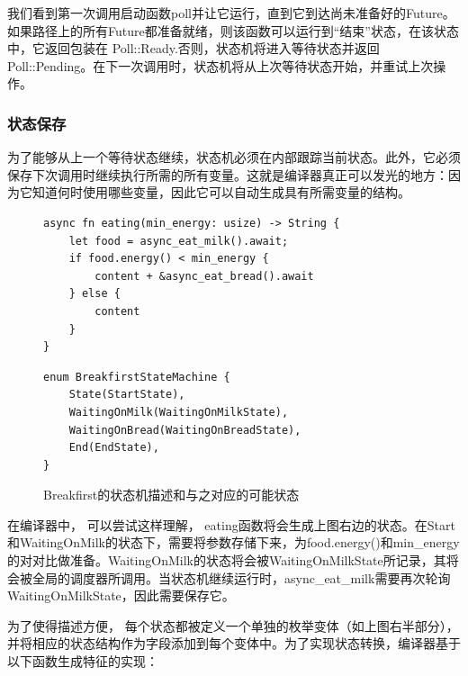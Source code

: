 我们看到第一次调用启动函数poll并让它运行，直到它到达尚未准备好的Future。如果路径上的所有Future都准备就绪，则该函数可以运行到“结束”状态，在该状态中，它返回包装在 Poll::Ready.否则，状态机将进入等待状态并返回Poll::Pending。在下一次调用时，状态机将从上次等待状态开始，并重试上次操作。


\subsubsection{状态保存}

为了能够从上一个等待状态继续，状态机必须在内部跟踪当前状态。此外，它必须保存下次调用时继续执行所需的所有变量。这就是编译器真正可以发光的地方：因为它知道何时使用哪些变量，因此它可以自动生成具有所需变量的结构。

\begin{figure}[htbp]
    \figureCapSet
	\centering
	\begin{minipage}{0.49\linewidth}%
		\centering
        \begin{lstlisting}[frame=none]
async fn eating(min_energy: usize) -> String {
    let food = async_eat_milk().await;
    if food.energy() < min_energy {
        content + &async_eat_bread().await
    } else {
        content
    }
}
        \end{lstlisting}
	\end{minipage}
    \hfill
	\begin{minipage}{0.49\linewidth}
		\centering
        \begin{lstlisting}[frame=none]
enum BreakfirstStateMachine {
    State(StartState),
    WaitingOnMilk(WaitingOnMilkState),
    WaitingOnBread(WaitingOnBreadState),
    End(EndState),
}
        \end{lstlisting}
	\end{minipage}
    \caption{Breakfirst的状态机描述和与之对应的可能状态}
\end{figure}


在编译器中， 可以尝试这样理解， eating函数将会生成上图右边的状态。在Start和WaitingOnMilk的状态下，需要将参数存储下来，为food.energy()和min\_energy的对对比做准备。WaitingOnMilk的状态将会被WaitingOnMilkState所记录，其将会被全局的调度器所调用。当状态机继续运行时，async\_eat\_milk需要再次轮询WaitingOnMilkState，因此需要保存它。

为了使得描述方便， 每个状态都被定义一个单独的枚举变体（如上图右半部分），并将相应的状态结构作为字段添加到每个变体中。为了实现状态转换，编译器基于以下函数生成特征的实现：

